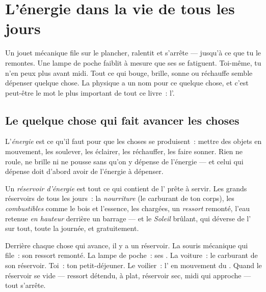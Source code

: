 \chapter{L'énergie dans la vie de tous les jours}\label{ch:g5:everyday-energy}

Un jouet mécanique file sur le plancher, ralentit et s'arrête ---
jusqu'à ce que tu le remontes. Une lampe de poche faiblit à mesure
que ses  se fatiguent. Toi-même, tu n'en peux plus avant midi.
Tout ce qui bouge, brille, sonne ou réchauffe semble dépenser quelque
chose. La physique a un nom pour ce quelque chose, et c'est peut-être
le mot le plus important de tout ce livre~: l'.

\section{Le quelque chose qui fait avancer les choses}

\begin{definition}[Énergie]\label{def:g5:everyday-energy:energy}
L'\emph{énergie} est ce qu'il faut pour que les choses
se produisent~: mettre des objets en mouvement, les soulever, les
éclairer, les réchauffer, les faire sonner. Rien ne roule, ne brille
ni ne pousse sans qu'on y dépense de l'énergie --- et celui qui
dépense doit d'abord avoir de l'énergie à dépenser.
\end{definition}

\begin{definition}\label{def:g5:everyday-energy:store}
Un \emph{réservoir d'énergie} est tout ce
qui contient de l' prête à servir. Les grands réservoirs de
tous les jours~: la \emph{nourriture} (le carburant de ton corps),
les \emph{combustibles} comme le bois et l'essence, les
\emph{} chargées, un \emph{ressort} remonté, l'eau retenue
\emph{en hauteur} derrière un barrage --- et le \emph{Soleil}
brûlant, qui déverse de l' sur tout, toute la journée, et
gratuitement.
\end{definition}

\begin{example}\label{ex:g5:everyday-energy:spot}
Derrière chaque chose qui avance, il y a un réservoir. La souris
mécanique qui file~: son ressort remonté. La lampe de poche~: ses
. La voiture~: le carburant de son réservoir. Toi~: ton
petit-déjeuner. Le voilier~: l' en mouvement du . Quand le
réservoir se vide --- ressort détendu,  à plat, réservoir sec,
midi qui approche --- tout s'arrête.
\end{example}

